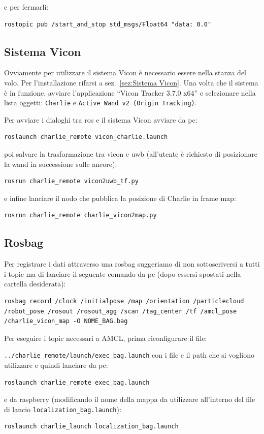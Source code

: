 e per fermarli:

\begin{lstlisting}[style=bash]
	rostopic pub /start_and_stop std_msgs/Float64 "data: 0.0"
\end{lstlisting}

\subsection*{Sistema Vicon}
Ovviamente per utilizzare il sistema Vicon \`e necessario essere nella stanza del volo. 
Per l'installazione rifarsi a sez.~\ref{sez:Sistema Vicon}. 
Una volta che il sistema \`e in funzione, avviare l'applicazione ``Vicon Tracker 3.7.0 x64'' e selezionare nella lista oggetti: \texttt{Charlie} e \texttt{Active Wand v2 (Origin Tracking)}.

Per avviare i dialoghi tra ros e il sistema Vicon avviare da pc:
\begin{lstlisting}[style=bashPC]
	roslaunch charlie_remote vicon_charlie.launch
\end{lstlisting}

poi salvare la trasformazione tra vicon e uwb (all'utente \`e richiesto di posizionare la wand in successione sulle ancore):
\begin{lstlisting}[style=bashPC]
	rosrun charlie_remote vicon2uwb_tf.py
\end{lstlisting}

e infine lanciare il nodo che pubblica la posizione di Charlie in frame map:
\begin{lstlisting}[style=bashPC]
	rosrun charlie_remote charlie_vicon2map.py
\end{lstlisting}


\subsection*{Rosbag}
Per registrare i dati attraverso una rosbag suggeriamo di non sottoscriversi a tutti i topic ma di lanciare il seguente comando da pc (dopo essersi spostati nella cartella desiderata):
\begin{lstlisting}[style=bashPC]
	rosbag record /clock /initialpose /map /orientation /particlecloud /robot_pose /rosout /rosout_agg /scan /tag_center /tf /amcl_pose /charlie_vicon_map -O NOME_BAG.bag
\end{lstlisting}

Per eseguire i topic necessari a AMCL, prima riconfigurare il file:

\verb|../charlie_remote/launch/exec_bag.launch| con i file e il path che si vogliono utilizzare e quindi lanciare da pc:
\begin{lstlisting}[style=bashPC]
	roslaunch charlie_remote exec_bag.launch
\end{lstlisting}
e da raspberry (modificando il nome della mappa da utilizzare all'interno del file di lancio \verb|localization_bag.launch|):
\begin{lstlisting}[style=bash]
	roslaunch charlie_launch localization_bag.launch
\end{lstlisting}

